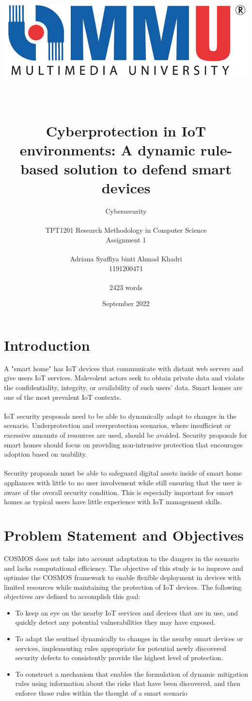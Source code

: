 \documentclass[12pt]{report}
\title{\includegraphics[scale=1.5]{mmuLogo.jpg}
\\ \\ \\Cyberprotection in IoT environments: A dynamic rule-based solution to defend smart devices}
\author{Cybersecurity\\\\TPT1201 Research Methodology in Computer Science\\Assignment 1\\ \\Adriana Syaffiya binti Ahmad Khadri \\ 1191200471 \\ \\2423 words}
\date {September 2022}
\begin{document}
\maketitle
\section{Introduction}
A "smart home" has IoT devices that communicate with distant web servers and give users IoT services. Malevolent actors seek to obtain private data and violate the confidentiality, integrity, or availability of such users' data. Smart homes are one of the most prevalent IoT contexts.
\\ \\
IoT security proposals need to be able to dynamically adapt to changes in the scenario. Underprotection and overprotection scenarios, where insufficient or excessive amounts of resources are used, should be avoided. Security proposals for smart homes should focus on providing non-intrusive protection that encourages adoption based on usability.
\\ \\
Security proposals must be able to safeguard digital assets inside of smart home appliances with little to no user involvement while still ensuring that the user is aware of the overall security condition. This is especially important for smart homes as typical users have little experience with IoT management skills.

\section{Problem Statement and Objectives}
COSMOS does not take into account adaptation to the dangers in the scenario and lacks computational efficiency. The objective of this study is to improve and optimise the COSMOS framework to enable flexible deployment in devices with limited resources while maintaining the protection of IoT devices. The following objectives are defined to accomplish this goal:

\begin{itemize}
\setlength{\itemsep}{-5pt}
\item To keep an eye on the nearby IoT services and devices that are in use, and quickly detect any potential vulnerabilities they may have exposed.
\item To adapt the sentinel dynamically to changes in the nearby smart devices or services, implementing rules appropriate for potential newly discovered security defects to consistently provide the highest level of protection.
\item To construct a mechanism that enables the formulation of dynamic mitigation rules using information about the risks that have been discovered, and then enforce those rules within the thought of a smart scenario
\end{itemize}
\end{document}
